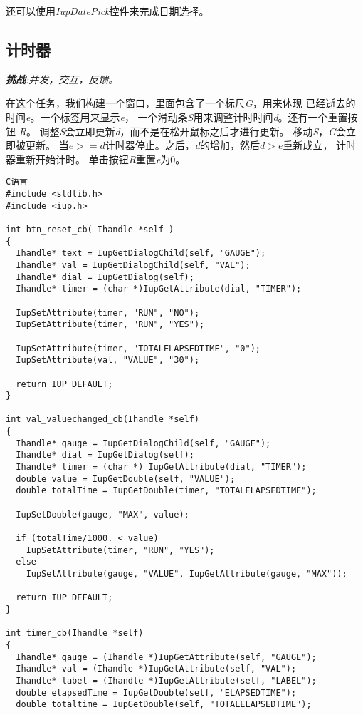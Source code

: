 \documentclass{ctexart}
\begin{document}
还可以使用\emph{IupDatePick}控件来完成日期选择。

\subsection{计时器}

\emph{\textbf{挑战}:并发，交互，反馈。}

在这个任务，我们构建一个窗口，里面包含了一个标尺\emph{G}，用来体现
已经逝去的时间\emph{e}。一个标签用来显示\emph{e}，
一个滑动条\emph{S}用来调整计时时间\emph{d}。还有一个重置按钮
\emph{R}。
调整\emph{S}会立即更新\emph{d}，而不是在松开鼠标之后才进行更新。
移动\emph{S}，\emph{G}会立即被更新。
当$e>=d$计时器停止。之后，\emph{d}的增加，然后$d>e$重新成立，
计时器重新开始计时。
单击按钮\emph{R}重置\emph{e}为$0$。

\lstset{language=C}
\begin{lstlisting}
C语言
#include <stdlib.h>
#include <iup.h>

int btn_reset_cb( Ihandle *self )
{
  Ihandle* text = IupGetDialogChild(self, "GAUGE");
  Ihandle* val = IupGetDialogChild(self, "VAL");
  Ihandle* dial = IupGetDialog(self);
  Ihandle* timer = (char *)IupGetAttribute(dial, "TIMER");

  IupSetAttribute(timer, "RUN", "NO");
  IupSetAttribute(timer, "RUN", "YES");

  IupSetAttribute(timer, "TOTALELAPSEDTIME", "0");
  IupSetAttribute(val, "VALUE", "30");

  return IUP_DEFAULT;
}

int val_valuechanged_cb(Ihandle *self)
{
  Ihandle* gauge = IupGetDialogChild(self, "GAUGE");
  Ihandle* dial = IupGetDialog(self);
  Ihandle* timer = (char *) IupGetAttribute(dial, "TIMER");
  double value = IupGetDouble(self, "VALUE");
  double totalTime = IupGetDouble(timer, "TOTALELAPSEDTIME");

  IupSetDouble(gauge, "MAX", value);

  if (totalTime/1000. < value)
    IupSetAttribute(timer, "RUN", "YES");
  else
    IupSetAttribute(gauge, "VALUE", IupGetAttribute(gauge, "MAX"));

  return IUP_DEFAULT;
}

int timer_cb(Ihandle *self)
{
  Ihandle* gauge = (Ihandle *)IupGetAttribute(self, "GAUGE");
  Ihandle* val = (Ihandle *)IupGetAttribute(self, "VAL");
  Ihandle* label = (Ihandle *)IupGetAttribute(self, "LABEL");
  double elapsedTime = IupGetDouble(self, "ELAPSEDTIME");
  double totaltime = IupGetDouble(self, "TOTALELAPSEDTIME");


\end{lstlisting}
\end{document}
